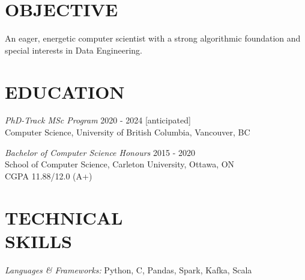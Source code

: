 \documentclass[margin]{res}
\newcommand{\CC}{C\nolinebreak\hspace{-.05em}\raisebox{.4ex}{\tiny\bf +}\nolinebreak\hspace{-.10em}\raisebox{.4ex}{\tiny\bf +}}
\begin{document}
\begin{resume}
\section{OBJECTIVE}  An eager, energetic computer scientist with a strong algorithmic foundation and special 
interests in Data Engineering.  


\section{EDUCATION} 

{\sl PhD-Track MSc Program}  \hfill 2020 - 2024 [anticipated]\\
Computer Science, University of British Columbia, Vancouver, BC

{\sl Bachelor of Computer Science Honours}  \hfill 2015 - 2020\\
School of Computer Science, Carleton University, Ottawa, ON \\
CGPA 11.88/12.0 (A+)\\

\section{TECHNICAL \\ SKILLS} {\sl Languages \& Frameworks:} Python, \CC, Pandas, Spark, Kafka, Scala


\end{resume}
\end{document}
